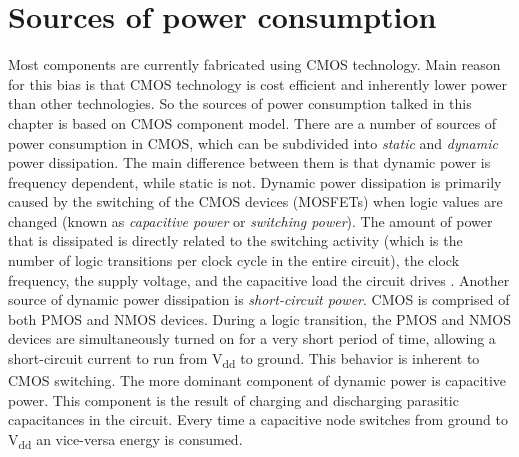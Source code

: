 \section{Sources of power consumption}\label{src_pwr}
Most components are currently fabricated using CMOS technology\cite{cypress, silicon}. Main reason for this bias is that CMOS technology is cost efficient and inherently lower power than other technologies. So the sources of power consumption talked in this chapter is based on CMOS component model. There are a number of sources of power consumption in CMOS, which can be subdivided into \textit{static} and \textit{dynamic} power dissipation. The main difference between them is that dynamic power is frequency dependent, while static is not. Dynamic power dissipation is primarily caused by the switching of the CMOS devices (MOSFETs) when logic values are changed (known as \textit{capacitive power} or \textit{switching power}). The amount of power that is dissipated is directly related to the switching activity (which is the number of logic transitions per clock cycle in the entire circuit), the clock frequency, the supply voltage, and the capacitive load the circuit drives \cite{PowerAwareDesign}. Another source of dynamic power dissipation is \textit{short-circuit power}. CMOS is comprised of both PMOS and NMOS devices. During a logic transition, the PMOS and NMOS devices are simultaneously turned on for a very short period of time, allowing a short-circuit current to run from V\textsubscript{dd} to ground\cite{Low-powercmos, LowPowerDesign}. This behavior is inherent to CMOS switching. The more dominant component of dynamic power is capacitive power. This component is the result of charging and discharging parasitic capacitances in the circuit. Every time a capacitive node switches from ground to V\textsubscript{dd} an vice-versa energy is consumed. 

